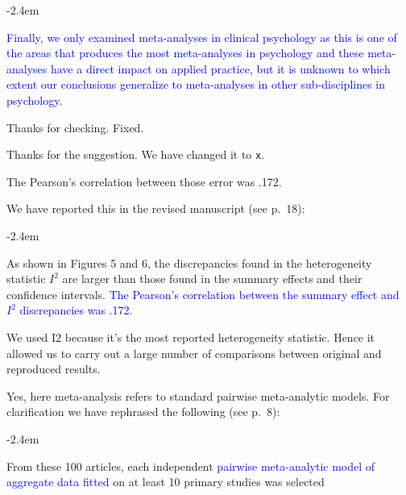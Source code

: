 \documentclass[draft]{article}
\renewenvironment{quote}{\begin{fquote}\advance\leftmargini -2.4em\begin{oldquote}}{\end{oldquote}\end{fquote}}
\newenvironment{fquote}
  {\def\FrameCommand{
	\fboxsep=0.6em %
	\fcolorbox{black}{white}}%
    \MakeFramed {\advance\hsize-2\width \FrameRestore}
    \begin{minipage}{\linewidth}
  }
  {\end{minipage}\endMakeFramed}
\begin{document}
\begin{quote}
\textcolor{blue}{Finally, we only examined meta-analyses in clinical psychology as this is one of the areas that produces the most meta-analyses in psychology and these meta-analyses have a direct impact on applied practice, but it is unknown to which extent our conclusions generalize to meta-analyses in other sub-disciplines in psychology.}
\end{quote}


Thanks for checking. Fixed.


Thanks for the suggestion. We have changed it to \texttt{x}.


The Pearson's correlation between those error was .172.

We have reported this in the revised manuscript (see p.~18):

\begin{quote}
As shown in Figures 5 and 6, the discrepancies found in the heterogeneity statistic \(I^2\) are larger than those found in the summary effects and their confidence intervals. \textcolor{blue}{The Pearson's correlation between the summary effect and $I^2$ discrepancies was .172.}
\end{quote}


We used I2 because it's the most reported heterogeneity statistic. Hence it allowed us to carry out a large number of comparisons between original and reproduced results.


Yes, here meta-analysis refers to standard pairwise meta-analytic models. For clarification we have rephrased the following (see p.~8):

\begin{quote}
From these 100 articles, each independent \textcolor{blue} {pairwise meta-analytic model of aggregate data fitted} on at least 10 primary studies was selected
\end{quote}
\end{document}
